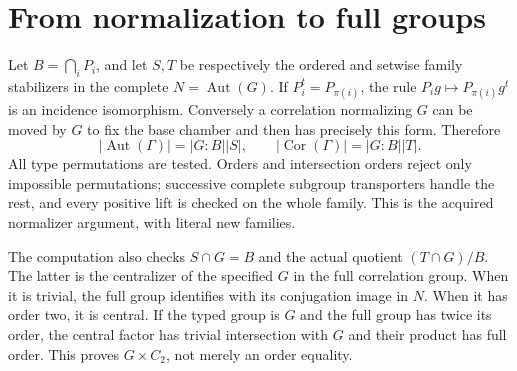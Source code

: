 \documentclass[11pt]{article}
\newcommand{\Aut}{\operatorname{Aut}}\newcommand{\Cor}{\operatorname{Cor}}
\begin{document}
\section*{From normalization to full groups}
Let $B=\bigcap_iP_i$, and let $S,T$ be respectively the ordered and
setwise family stabilizers in the complete $N=\Aut(G)$.
If $P_i^t=P_{\pi(i)}$, the rule
$P_i g\mapsto P_{\pi(i)}g^t$ is an incidence isomorphism.
Conversely a correlation normalizing $G$ can be moved by $G$ to fix
the base chamber and then has precisely this form. Therefore
\[
 |\Aut(\Gamma)|=|G:B||S|,\qquad
 |\Cor(\Gamma)|=|G:B||T|.
\]
All type permutations are tested. Orders and intersection orders reject
only impossible permutations; successive complete subgroup transporters
handle the rest, and every positive lift is checked on the whole family.
This is the acquired normalizer argument, with literal new families.

The computation also checks $S\cap G=B$ and the actual quotient
$(T\cap G)/B$. The latter is the centralizer of the specified $G$
in the full correlation group. When it is trivial, the full group
identifies with its conjugation image in $N$. When it has order two,
it is central. If the typed group is $G$ and the full group has twice
its order, the central factor has trivial intersection with $G$ and
their product has full order. This proves $G\times C_2$, not merely
an order equality.
\end{document}
